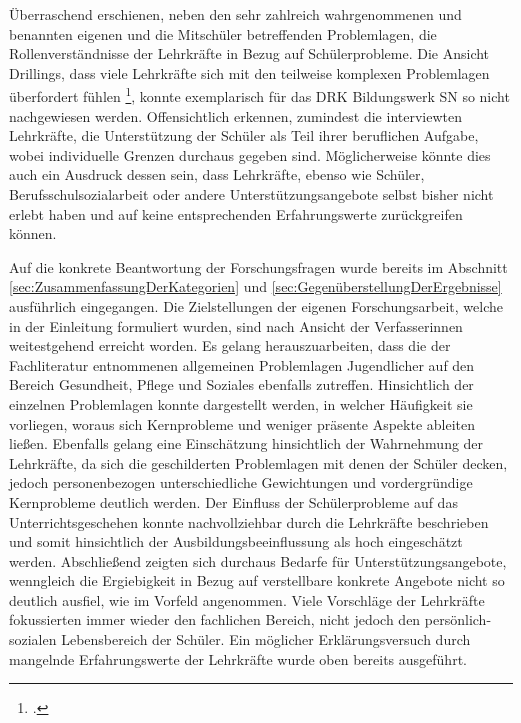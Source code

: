 Überraschend erschienen, neben den sehr zahlreich wahrgenommenen und benannten eigenen und die Mitschüler betreffenden Problemlagen, die Rollenverständnisse der Lehrkräfte in Bezug auf Schülerprobleme. Die Ansicht Drillings, dass viele Lehrkräfte sich mit den teilweise komplexen Problemlagen überfordert fühlen \footcite[vgl.][10]{Drilling2004}, konnte exemplarisch für das DRK Bildungswerk SN so nicht nachgewiesen werden. Offensichtlich erkennen, zumindest die interviewten Lehrkräfte, die Unterstützung der Schüler als Teil ihrer beruflichen Aufgabe, wobei individuelle Grenzen durchaus gegeben sind. Möglicherweise könnte dies auch ein Ausdruck dessen sein, dass Lehrkräfte, ebenso wie Schüler, Berufsschulsozialarbeit oder andere Unterstützungsangebote selbst bisher nicht erlebt haben und auf keine entsprechenden Erfahrungswerte zurückgreifen können. 

Auf die konkrete Beantwortung der Forschungsfragen wurde bereits im Abschnitt \ref{sec:ZusammenfassungDerKategorien} und \ref{sec:GegenüberstellungDerErgebnisse} ausführlich eingegangen. Die Zielstellungen der eigenen Forschungsarbeit, welche in der Einleitung formuliert wurden, sind nach Ansicht der Verfasserinnen weitestgehend erreicht worden. Es gelang herauszuarbeiten, dass die der Fachliteratur entnommenen allgemeinen Problemlagen Jugendlicher auf den Bereich Gesundheit, Pflege und Soziales ebenfalls zutreffen. Hinsichtlich der einzelnen Problemlagen konnte dargestellt werden, in welcher Häufigkeit sie vorliegen, woraus sich Kernprobleme und weniger präsente Aspekte ableiten ließen. Ebenfalls gelang eine Einschätzung hinsichtlich der Wahrnehmung der Lehrkräfte, da sich die geschilderten Problemlagen mit denen der Schüler decken, jedoch personenbezogen unterschiedliche Gewichtungen und vordergründige Kernprobleme deutlich werden. Der Einfluss der Schülerprobleme auf das Unterrichtsgeschehen konnte nachvollziehbar durch die Lehrkräfte beschrieben und somit hinsichtlich der Ausbildungsbeeinflussung als hoch eingeschätzt werden. Abschließend zeigten sich durchaus Bedarfe für Unterstützungsangebote, wenngleich die Ergiebigkeit in Bezug auf verstellbare konkrete Angebote nicht so deutlich ausfiel, wie im Vorfeld angenommen. Viele Vorschläge der Lehrkräfte fokussierten immer wieder den fachlichen Bereich, nicht jedoch den persönlich-sozialen Lebensbereich der Schüler. Ein möglicher Erklärungsversuch durch mangelnde Erfahrungswerte der Lehrkräfte wurde oben bereits ausgeführt. 

